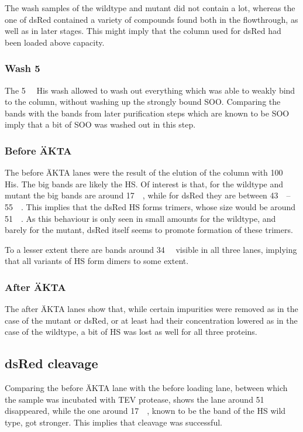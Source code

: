 The wash samples of the wildtype and mutant did not contain a lot, whereas the
one of dsRed contained a variety of compounds found both in the flowthrough, as
well as in later stages. This might imply that the column used for dsRed had
been loaded above capacity.

\subsubsection{Wash \SI{5}{\milli\Molar}}

The \SI{5}{\milli\Molar} His wash allowed to wash out everything which was able
to weakly bind to the column, without washing up the strongly bound SOO.
Comparing the bands with the bands from later purification steps which are
known to be SOO imply that a bit of SOO was washed out in this step.

\subsubsection{Before ÄKTA}

The before ÄKTA lanes were the result of the elution of the column with
\SI{100}{\milli\Molar} His. The big bands are likely the HS. Of interest is
that, for the wildtype and mutant the big bands are around \SI{17}{\kilo\Da},
while for dsRed they are between \SIrange{43}{55}{\kilo\Da}. This implies that
the dsRed HS forms trimers, whose size would be around \SI{51}{\kilo\Da}. As
this behaviour is only seen in small amounts for the wildtype, and barely for
the mutant, dsRed itself seems to promote formation of these trimers.

To a lesser extent there are bands around \SI{34}{\kilo\Da} visible in all
three lanes, implying that all variants of HS form dimers to some extent.

\subsubsection{After ÄKTA}
The after ÄKTA lanes show that, while certain impurities were removed as in the
case of the mutant or dsRed, or at least had their concentration lowered as in
the case of the wildtype, a bit of HS was lost as well for all three proteins.

\subsection{dsRed cleavage}

Comparing the before ÄKTA lane with the before loading lane, between which the
sample was incubated with TEV protease, shows the lane around \SI{51}{\kilo\Da}
disappeared, while the one around \SI{17}{\kilo\Da}, known to be the band of
the HS wild type, got stronger. This implies that cleavage was successful.

